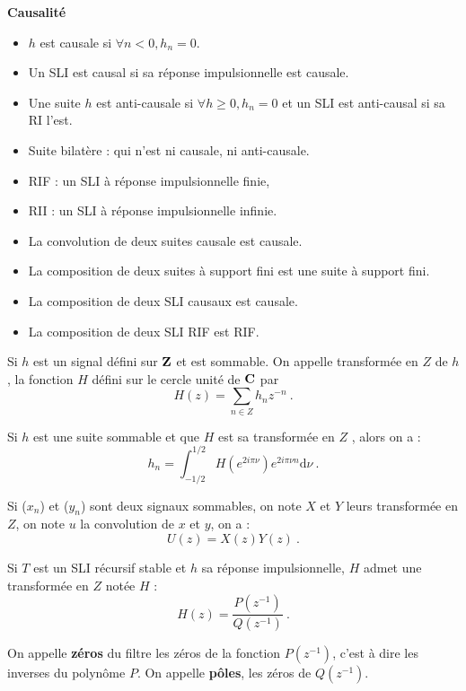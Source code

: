 \begin{voc}
	\textbf{Causalité}
	\begin{itemize}
	\item $h$ est causale si $\forall n<0, h_{n}=0$.
	\item Un SLI est causal si sa réponse impulsionnelle est causale.
	\item Une suite $h$ est anti-causale si $\forall h \geq 0, h_n = 0$ et un SLI est anti-causal si sa RI l'est.
	\item Suite bilatère : qui n'est ni causale, ni anti-causale.
	\item RIF : un SLI à réponse impulsionnelle finie,
	\item RII : un SLI à réponse impulsionnelle infinie.
	\end{itemize}
\end{voc}

\begin{pop}
	\begin{itemize}
	\item La convolution de deux suites causale est causale.
	\item La composition de deux suites à support fini est une suite à support fini.
	\item La composition de deux SLI causaux est causale.
	\item La composition de deux SLI RIF est RIF.
	\end{itemize}
\end{pop}

\begin{defn}[Transformée en $Z$]
	Si $h$ est un signal défini sur $\mathbf{Z}$ et est sommable. On appelle transformée en $Z$ de $h$, la fonction $H$ défini sur le cercle unité de $\mathbf{C}$ par
	$$H(z) = \sum_{n\in Z} h_{n}z^{-n}\ .$$
\end{defn}

\begin{pop}
Si $h$ est une suite sommable et que $H$ est sa transformée en $Z$ , alors on a :
$$h_{n}= \int_{-1/2}^{1/2}H(e^{2i\pi \nu})e^{2i\pi \nu n}\mathrm{d}\nu\ .$$
\end{pop}

\begin{pop}
Si ($x_{n}$) et ($y_{n}$) sont deux signaux sommables, on note $X$ et $Y$ leurs transformée en $Z$, on note $u$ la convolution de $x$ et $y$, on a :
$$U(z)=X(z)Y(z)\ .$$
\end{pop}

\begin{pop}
Si $T$ est un SLI récursif stable et $h$ sa réponse impulsionnelle, $H$ admet une transformée en $Z$ notée $H$ :
$$H(z) = \dfrac{P(z^{-1})}{Q(z^{-1})}\ .$$
\end{pop}

\begin{defn}
	On appelle \textbf{zéros} du filtre les zéros de la fonction $P(z^{-1})$, c'est à dire les inverses du polynôme $P$.
	On appelle \textbf{pôles}, les zéros de $Q(z^{-1})$.
\end{defn}